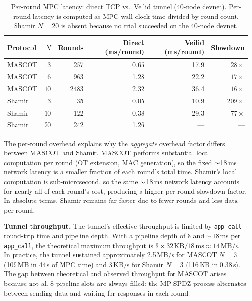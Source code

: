 \begin{table}[H]
\centering
\small
\begin{tabular}{lrrrrr}
\toprule
\textbf{Protocol} & $N$ & \textbf{Rounds} & \textbf{Direct (ms/round)} &
  \textbf{Veilid (ms/round)} & \textbf{Slowdown} \\
\midrule
MASCOT  & $3$  & 257  & 0.65  & 17.9  & $28\times$ \\
MASCOT  & $6$  & 963  & 1.28  & 22.2  & $17\times$ \\
MASCOT  & $10$ & 2483 & 2.32  & 36.4  & $16\times$ \\
Shamir  & $3$  & 35   & 0.05  & 10.9  & $209\times$ \\
Shamir  & $10$ & 122  & 0.38  & 29.3  & $77\times$ \\
Shamir  & $20$ & 242  & 1.26  & ---   & ---  \\
\bottomrule
\end{tabular}
\caption{Per-round MPC latency: direct TCP vs.\ Veilid tunnel (40-node
  devnet).  Per-round latency is computed as MPC wall-clock time divided
  by round count.  Shamir $N{=}20$ is absent because no trial succeeded
  on the 40-node devnet.}
\label{tab:per-round-latency}
\end{table}

The per-round overhead explains why the \emph{aggregate} overhead factor
differs between MASCOT and Shamir.  MASCOT performs substantial local
computation per round (OT extension, MAC generation), so the fixed
${\thicksim}$18\,ms network latency is a smaller fraction of each round's total
time.  Shamir's local computation is sub-microsecond, so the same
${\thicksim}$18\,ms network latency accounts for nearly all of each round's
cost, producing a higher per-round slowdown factor.  In absolute terms,
Shamir remains far faster due to fewer rounds and less data per round.

\textbf{Tunnel throughput.}  The tunnel's effective throughput is limited by
\texttt{app\_call} round-trip time and pipeline depth.  With a pipeline depth
of 8 and ${\thicksim}$18\,ms per \texttt{app\_call}, the theoretical maximum
throughput is $8 \times 32\,\text{KB} / 18\,\text{ms} \approx 14\,\text{MB/s}$.
In practice, the tunnel sustained approximately 2.5\,MB/s for MASCOT $N{=}3$
(109\,MB in 44\,s of MPC time) and 3\,KB/s for Shamir $N{=}3$ (116\,KB in
0.38\,s).  The gap between theoretical and observed throughput for MASCOT
arises because not all 8 pipeline slots are always filled: the MP-SPDZ process
alternates between sending data and waiting for responses in each round.

